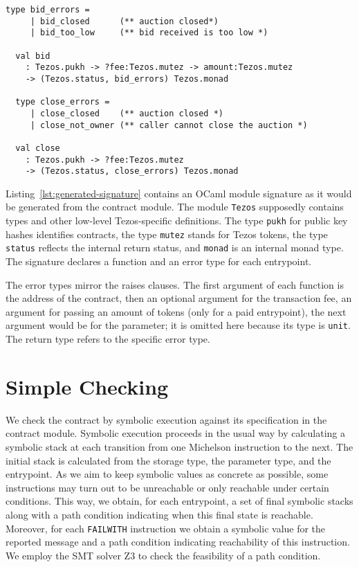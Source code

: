\documentclass[a4paper,USenglish,american,cleveref, autoref, thm-restate]{oasics-v2021}
\begin{document}
\begin{lstlisting}[float,captionpos=b,caption={Generated signature},label={lst:generated-signature}]
  type bid_errors = 
     | bid_closed      (** auction closed*)
     | bid_too_low     (** bid received is too low *)

  val bid
    : Tezos.pukh -> ?fee:Tezos.mutez -> amount:Tezos.mutez
    -> (Tezos.status, bid_errors) Tezos.monad

  type close_errors = 
     | close_closed    (** auction closed *)
     | close_not_owner (** caller cannot close the auction *)

  val close
    : Tezos.pukh -> ?fee:Tezos.mutez
    -> (Tezos.status, close_errors) Tezos.monad
\end{lstlisting}
Listing~\ref{lst:generated-signature} contains an OCaml module
signature as it would be generated from the contract module. The
module \lstinline/Tezos/ supposedly contains types and other low-level
Tezos-specific definitions. The type \lstinline/pukh/ for public
key hashes identifies contracts, the type \lstinline/mutez/ stands for
Tezos tokens, the type \lstinline/status/ reflects the internal return
status, and \lstinline/monad/ is an internal monad type. The signature
declares a function and an error type for each entrypoint.

The error types mirror the raises clauses. The first argument of each
function is the address of the contract, then an optional argument for
the transaction fee, an argument for passing an amount of tokens
(only for a paid entrypoint), the next argument would be for
the parameter; it is omitted here because its type is
\lstinline/unit/. The return type refers to the specific error type.

\section{Simple Checking}
\label{sec:check-contr-against}

We check the contract by symbolic execution against its
specification in the contract module. Symbolic execution proceeds in
the usual way by calculating a symbolic stack at each transition from
one Michelson instruction to the next. The initial stack is calculated
from the storage type, the parameter type, and the entrypoint.
As we aim to keep symbolic
values as concrete as possible, some instructions may turn out to be
unreachable or only reachable under certain conditions. This way, we
obtain, for each entrypoint, a set of final symbolic stacks along with
a path condition indicating when this final state is
reachable. Moreover, for each \lstinline/FAILWITH/ instruction we
obtain a symbolic value for the reported message and a path condition
indicating reachability of this instruction. We employ the SMT solver
Z3 \cite{DBLP:conf/tacas/MouraB08,DBLP:conf/setss/BjornerMNW18} to
check the feasibility of a path condition. 
\end{document}
